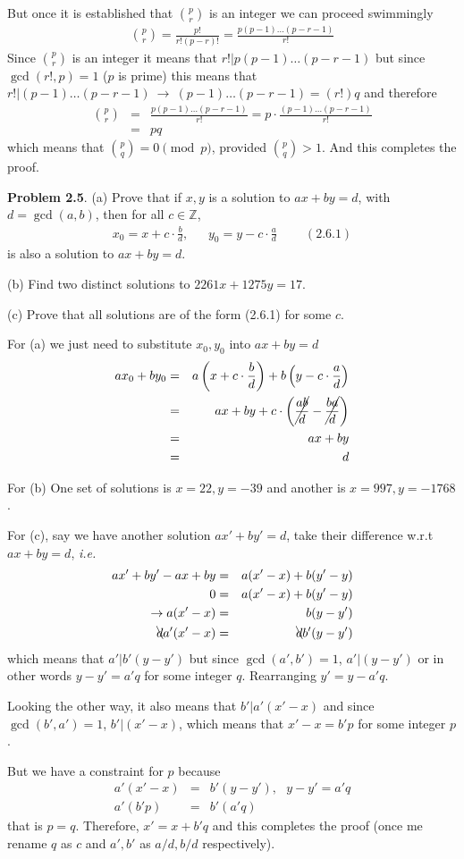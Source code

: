\documentclass[aps,preprint,preprintnumbers,nofootinbib,showpacs,prd]{revtex4-1}
\newcommand{\ie}{{\it i.e.} }
\newcommand{\nbea}{\begin{eqnarray*}}
\newcommand{\neea}{\end{eqnarray*}}
\begin{document}
But once it is established that $\binom{p}{r}$ is an integer we can proceed swimmingly
%
\nbea
\binom{p}{r} = \frac{p!}{r!(p-r)!} = \frac{p (p-1) \dots (p-r-1)}{r!}
\neea
%
Since $\binom{p}{r}$ is an integer it means that $r!|p (p-1) \dots (p-r-1)$ but since $\gcd(r!, p) = 1$ ($p$ is prime) this means that $r!|(p-1) \dots (p-r-1)~\to ~ (p-1) \dots (p-r-1) = (r!) q$ and therefore
%
\nbea
\binom{p}{r} & = & \frac{p (p-1) \dots (p-r-1)}{r!} = p \cdot \frac{(p-1) \dots (p-r-1)}{r!} \\
& = & p q
\neea
%
which means that $\binom{p}{q} = 0 \pmod{p}$, provided $\binom{p}{q} > 1$. And this completes the proof.

{\bf Problem 2.5}. (a) Prove that if $x, y$ is a solution to $ax+by = d$, with $d = \gcd(a, b)$,
then for all $c \in \mathbb{Z}$,
%
\nbea
x_0 = x + c \cdot \frac{b}{d}, ~~~~~~~ y_0 = y - c \cdot \frac{a}{d} ~~~~~~~~~~(2.6.1)
\neea
%
is also a solution to $ax + by = d$.

(b) Find two distinct solutions to $2261x + 1275y = 17$.

(c) Prove that all solutions are of the form (2.6.1) for some $c$.

For (a) we just need to substitute $x_0, y_0$ into $ax+by = d$
%
\nbea
ax_0+by_0 & = & a \left( x + c \cdot \frac{b}{d} \right ) + b \left( y - c \cdot \frac{a}{d} \right ) \\
& = & ax + by + c \cdot \left ( \cancel{\frac{ab}{d}} - \cancel{ \frac{ba}{d}} \right ) \\
& = & ax + by \\
& = & d
\neea
%

For (b) One set of solutions is $x = 22, y = -39$ and another is $x = 997, y = -1768$.

For (c), say we have another solution $ax'+by' = d$, take their difference w.r.t $ax+by = d$, \ie 
%
\nbea
ax'+by' - ax+by & = & a(x' - x) + b(y' - y) \\
0 & = & a(x' - x) + b(y' - y) \\
\to a(x' - x) & = & b(y - y') \\
\bcancel{d}a'(x' - x) & = & \bcancel{d}b'(y - y')
\neea
%
which means that $a'|b'(y-y')$ but since $\gcd(a',b') = 1$, $a'|(y-y')$ or in other words $y - y' = a' q$ for some integer $q$. Rearranging $y' = y - a'q$.

Looking the other way, it also means that $b'|a'(x'-x)$ and since $\gcd(b',a') = 1$, $b'|(x'-x)$, which means that $x'-x = b'p$ for some integer $p$.

But we have a constraint for $p$ because 
%
\nbea
a'(x' - x) & = & b'(y - y'), ~~~ y - y' = a' q\\
a'(b'p) & = & b'(a'q)
\neea
%
that is $p=q$. Therefore, $x' = x + b'q$ and this completes the proof (once me rename $q$ as $c$ and $a', b'$ as $a/d, b/d$ respectively).
\end{document}
